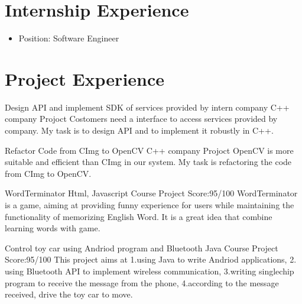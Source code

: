 \documentclass[11pt,a4paper]{moderncv}
\begin{document}
\section{Internship Experience}
{
\begin{itemize}
\item Position: Software Engineer
\end{itemize}
}

\section{Project Experience}

{Design API and implement SDK of services provided by intern company}
{C++}
{company Projoct}
{}
{
Costomers need a interface to access services provided by company. My task is to design API and to implement it robustly in C++. 
}

\vspace*{0.2\baselineskip}
{Refactor Code from CImg to OpenCV}
{C++}
{company Projoct}
{}
{
OpenCV is more suitable and efficient than CImg in our system. My task is refactoring the code from CImg to OpenCV.
}

\vspace*{0.2\baselineskip}
{WordTerminator}
{Html, Javascript}
{Course Project}
{Score:95/100}
{
WordTerminator is a game, aiming at providing funny experience for users while maintaining the functionality of memorizing English Word.
It is a great idea that combine learning words with game.\\
}

\vspace*{0.2\baselineskip}
{Control toy car using Andriod program and Bluetooth}
{Java}
{Course Project}
{Score:95/100}
{
This project aims at 1.using Java to write Andriod applications, 2. using Bluetooth API to implement wireless communication, 3.writing singlechip program to receive the message from the phone, 4.according to the message received, drive the toy car to move.\\
}
\end{document}
